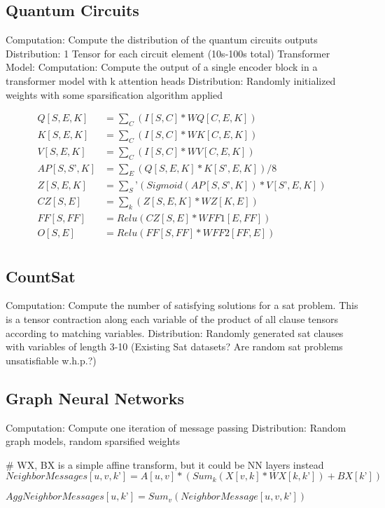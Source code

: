 \documentclass{article}
\begin{document}
\subsection{Quantum Circuits}
	Computation: Compute the distribution of the quantum circuits outputs
	Distribution: 1 Tensor for each circuit element (10s-100s total)
Transformer Model:
	Computation: Compute the output of a single encoder block in a transformer model with k attention heads
	Distribution: Randomly initialized weights with some sparsification algorithm applied
 
 \begin{align*}
Q[S, E, K] &= \sum_C(I[S, C] * WQ[C, E, K])\\
K[S, E, K] &= \sum_C(I[S, C] * WK[C, E, K])\\
V[S, E, K] &= \sum_C(I[S, C] * WV[C, E, K])\\
AP[S, S’, K] &= \sum_E(Q[S, E, K] * K[S’, E, K]) / 8\\
Z[S, E, K] &= \sum_S’(Sigmoid(AP[S,S’,K]) * V[S’, E, K])\\
CZ[S, E] &= \sum_k(Z[S, E, K] * WZ[K,E])\\
FF[S,FF] &= Relu(CZ[S,E] * WFF1[E,FF])\\
O[S,E] &= Relu(FF[S,FF] * WFF2[FF,E])\\
\end{align*}

\subsection{CountSat}
	Computation: Compute the number of satisfying solutions for a sat problem. This is a tensor contraction along each variable of the product of all clause tensors according to matching variables.
	Distribution: Randomly generated sat clauses with variables of length 3-10 (Existing Sat datasets? Are random sat problems unsatisfiable w.h.p.?)

\subsection{Graph Neural Networks}
	Computation: Compute one iteration of message passing
	Distribution: Random graph models, random sparsified weights

# WX, BX is a simple affine transform, but it could be NN layers instead
$NeighborMessages[u, v, k’] = A[u, v]*(Sum_k(X[v, k]*WX[k, k’]) +BX[k’])  $

$AggNeighborMessages[u, k’] = Sum_v(NeighborMessage[u, v, k’])$
\end{document}
